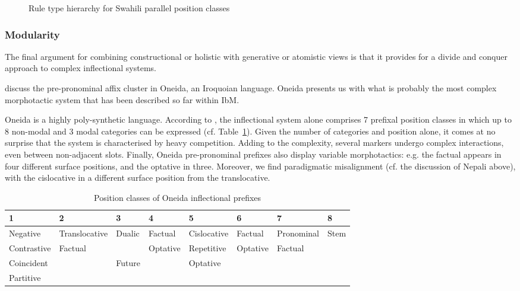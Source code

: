 \begin{figure}[htb]
  \caption{Rule type hierarchy for Swahili parallel position classes \citep{Crysmann:Bonami:2016}}
  \label{fig:Swahili}
\end{figure}

\subsubsection{Modularity}

The final argument for combining constructional or holistic with
generative or atomistic views is that it provides for a divide and
conquer approach to complex inflectional systems.

\citet{diaz:koenig:michelson:19} discuss the pre-pronominal affix
cluster in Oneida, an Iroquoian language. Oneida presents us with what
is probably the most complex morphotactic system that has been
described so far within IbM.

Oneida is a highly poly-synthetic language. According to
\citet{diaz:koenig:michelson:19}, the inflectional system alone
comprises 7 prefixal position classes in which up to 8 non-modal and 3
modal categories can be expressed (cf. Table~\ref{tab:Oneida}). Given the number of categories and
position alone, it comes at no surprise that the system is
characterised by heavy competition. Adding to the complexity, several
markers undergo complex interactions, even between non-adjacent slots.
Finally, Oneida pre-pronominal prefixes also display variable
morphotactics: e.g. the factual appears in four different surface
positions, and the optative in three. Moreover, we find paradigmatic
misalignment (cf. the discussion of Nepali above), with the
cislocative in a different surface position from the translocative.

\begin{table}[htb]
  \centering
  \scriptsize
  \begin{tabular}{l|l|l|l|l|l|l|l}
    \toprule
    1&2&3&4&5&6&7&8\\
    \midrule    Negative & Translocative & Dualic & Factual & Cislocative &
                                                                Factual
               & Pronominal & Stem\\

    Contrastive & Factual & & Optative & Repetitive & Optative &
                                                                 Factual
                 & \\
    Coincident & & Future & & Optative & &  \\
    Partitive & & & & & & &\\
    \bottomrule
  \end{tabular}
  \caption{Position classes of Oneida inflectional prefixes}
  \label{tab:Oneida}
\end{table}

